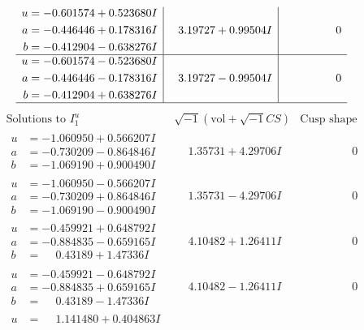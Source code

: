 \documentclass[1p]{elsarticle_modified}
\theoremstyle{definition}
\newcommand{\I}{\sqrt{-1}}
\begin{document}
$$\begin{array}{c|c|c}
\begin{aligned}
u &= -0.601574 + 0.523680 I \\
a &= -0.446446 + 0.178316 I \\
b &= -0.412904 - 0.638276 I\end{aligned}
 & \phantom{-}3.19727 + 0.99504 I & \phantom{-0.000000 } 0 \\ \hline\begin{aligned}
u &= -0.601574 - 0.523680 I \\
a &= -0.446446 - 0.178316 I \\
b &= -0.412904 + 0.638276 I\end{aligned}
 & \phantom{-}3.19727 - 0.99504 I & \phantom{-0.000000 } 0\\
 \hline 
 \end{array}$$\newpage$$\begin{array}{c|c|c}  
\text{Solutions to }I^u_{1}& \I (\text{vol} + \sqrt{-1}CS) & \text{Cusp shape}\\
 \hline 
\begin{aligned}
u &= -1.060950 + 0.566207 I \\
a &= -0.730209 - 0.864846 I \\
b &= -1.069190 + 0.900490 I\end{aligned}
 & \phantom{-}1.35731 + 4.29706 I & \phantom{-0.000000 } 0 \\ \hline\begin{aligned}
u &= -1.060950 - 0.566207 I \\
a &= -0.730209 + 0.864846 I \\
b &= -1.069190 - 0.900490 I\end{aligned}
 & \phantom{-}1.35731 - 4.29706 I & \phantom{-0.000000 } 0 \\ \hline\begin{aligned}
u &= -0.459921 + 0.648792 I \\
a &= -0.884835 - 0.659165 I \\
b &= \phantom{-}0.43189 + 1.47336 I\end{aligned}
 & \phantom{-}4.10482 + 1.26411 I & \phantom{-0.000000 } 0 \\ \hline\begin{aligned}
u &= -0.459921 - 0.648792 I \\
a &= -0.884835 + 0.659165 I \\
b &= \phantom{-}0.43189 - 1.47336 I\end{aligned}
 & \phantom{-}4.10482 - 1.26411 I & \phantom{-0.000000 } 0 \\ \hline\begin{aligned}
u &= \phantom{-}1.141480 + 0.404863 I \\

\end{aligned}
\end{array}$$
\end{document}
